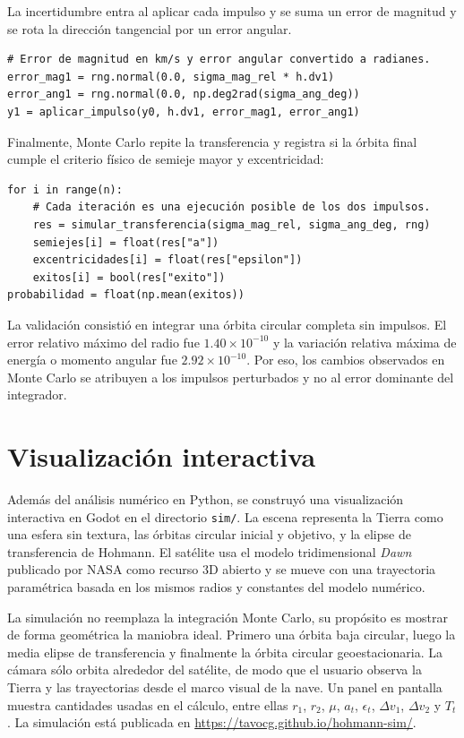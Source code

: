 \documentclass[12pt]{article}
\begin{document}
La incertidumbre entra al aplicar cada impulso y se suma un error de magnitud y
se rota la dirección tangencial por un error angular.

\begin{Verbatim}[fontsize=\footnotesize]
# Error de magnitud en km/s y error angular convertido a radianes.
error_mag1 = rng.normal(0.0, sigma_mag_rel * h.dv1)
error_ang1 = rng.normal(0.0, np.deg2rad(sigma_ang_deg))
y1 = aplicar_impulso(y0, h.dv1, error_mag1, error_ang1)
\end{Verbatim}

Finalmente, Monte Carlo repite la transferencia y registra si la órbita final
cumple el criterio físico de semieje mayor y excentricidad:

\begin{Verbatim}[fontsize=\footnotesize]
for i in range(n):
    # Cada iteración es una ejecución posible de los dos impulsos.
    res = simular_transferencia(sigma_mag_rel, sigma_ang_deg, rng)
    semiejes[i] = float(res["a"])
    excentricidades[i] = float(res["epsilon"])
    exitos[i] = bool(res["exito"])
probabilidad = float(np.mean(exitos))
\end{Verbatim}

La validación consistió en integrar una órbita circular completa sin impulsos.
El error relativo máximo del radio fue $1.40\times10^{-10}$ y la variación
relativa máxima de energía o momento angular fue $2.92\times10^{-10}$. Por eso,
los cambios observados en Monte Carlo se atribuyen a los impulsos perturbados y
no al error dominante del integrador.

\section{Visualización interactiva}

Además del análisis numérico en Python, se construyó una visualización
interactiva en Godot en el directorio \texttt{sim/}. La escena representa la
Tierra como una esfera sin textura, las órbitas circular inicial y objetivo, y
la elipse de transferencia de Hohmann. El satélite usa el modelo tridimensional
\textit{Dawn} publicado por NASA como recurso 3D abierto
\cite{nasaDawn3D} y se mueve con una trayectoria paramétrica basada en los
mismos radios y constantes del modelo numérico.

La simulación no reemplaza la integración Monte Carlo, su propósito es mostrar
de forma geométrica la maniobra ideal. Primero una órbita baja circular, luego
la media elipse de transferencia y finalmente la órbita circular
geoestacionaria. La cámara sólo orbita alrededor del satélite, de modo que el
usuario observa la Tierra y las trayectorias desde el marco visual de la nave.
Un panel en pantalla muestra cantidades usadas en el cálculo, entre ellas
$r_1$, $r_2$, $\mu$, $a_t$, $\epsilon_t$, $\Delta v_1$, $\Delta v_2$ y $T_t$.
La simulación está publicada en \url{https://tavocg.github.io/hohmann-sim/}.
\end{document}
